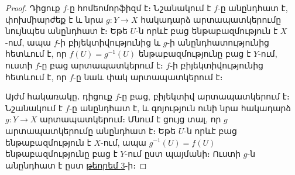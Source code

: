 \documentclass[./main.tex]{subfiles}
\begin{document}
\begin{proof} 
Դիցուք $f$-ը հոմեոմորֆիզմ է։ Նշանակում է $f$-ը անընդհատ է, փոխմիարժեք է և նրա $g:Y\rightarrow X$ հակադարձ արտապատկերումը նույնպես անընդ\-հատ է։ Եթե $U$-ն որևէ բաց ենթաբազմություն է $X$-ում, ապա $f$-ի բիյեկտիվությունից և $g$-ի անընդհատությունից հետևում է, որ $f(U)=g^{-1}(U)$ ենթաբազմությունը բաց է $Y\textrm{-ում}$, ուստի $f$-ը բաց արտապատկերում է։ $f$-ի բիյեկտիվությունից հետևում է, որ $f$-ը նաև փակ արտապատկերում է։ 

\par Այժմ հակառակը․ դիցուք $f$-ը բաց, բիյեկտիվ արտապատկերում է։ Նշանակում է $f$-ը անընդհատ է, և գոյություն ունի նրա հակադարձ $g:Y\rightarrow X$ արտապատկերում։ Մնում է ցույց տալ, որ $g$ արտապատկերումը անընդհատ է։ Եթե $U$-ն որևէ բաց են\-թա\-բազ\-մություն է $X$-ում, ապա $g^{-1}(U)=f(U)$ ենթաբազմությունը բաց է $Y$-ում ըստ պայմանի։
Ուստի $g$-ն անընդհատ է ըստ \hyperref[ch9thm3]{թեորեմ 3}-ի։
\end{proof}



\end{document}
